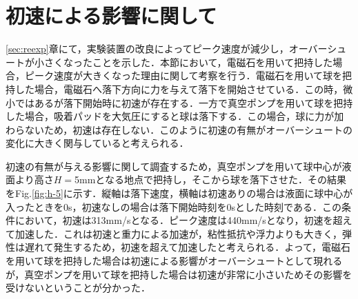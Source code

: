 

\section{初速による影響に関して}
\label{sec:interval-velocity}
\ref{sec:reexp}章にて，実験装置の改良によってピーク速度が減少し，オーバーシュートが小さくなったことを示した．本節において，電磁石を用いて把持した場合，ピーク速度が大きくなった理由に関して考察を行う．電磁石を用いて球を把持した場合，電磁石へ落下方向に力を与えて落下を開始させている．この時，微小ではあるが落下開始時に初速が存在する．一方で真空ポンプを用いて球を把持した場合，吸着パッドを大気圧にすると球は落下する．この場合，球に力が加わらないため，初速は存在しない．このように初速の有無がオーバーシュートの変化に大きく関与していると考えられる．

初速の有無が与える影響に関して調査するため，真空ポンプを用いて球中心が液面より高さ$H=$5mmとなる地点で把持し，そこから球を落下させた．その結果をFig.\ref{fig:h-5}に示す．縦軸は落下速度，横軸は初速ありの場合は液面に球中心が入ったときを0s，初速なしの場合は落下開始時刻を0sとした時刻である．この条件において，初速は313mm/sとなる．ピーク速度は440mm/sとなり，初速を超えて加速した．これは初速と重力による加速が，粘性抵抗や浮力よりも大きく，弾性は遅れて発生するため，初速を超えて加速したと考えられる．よって，電磁石を用いて球を把持した場合は初速による影響がオーバーシュートとして現れるが，真空ポンプを用いて球を把持した場合は初速が非常に小さいためその影響を受けないということが分かった．

